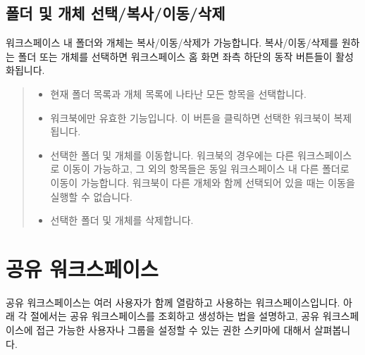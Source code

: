 \documentclass[letterpaper,10pt,english]{sphinxmanual}
\begin{document}
\subsection{폴더 및 개체 선택/복사/이동/삭제}
\label{\detokenize{discovery/part03/workspace_management:actions}}\label{\detokenize{discovery/part03/workspace_management:id5}}
워크스페이스 내 폴더와 개체는 복사/이동/삭제가 가능합니다. 복사/이동/삭제를 원하는 폴더 또는 개체를 선택하면 워크스페이스 홈 화면 좌측 하단의 동작 버튼들이 활성화됩니다.
\begin{quote}

\begin{figure}[H]
\centering

\noindent{}
\end{figure}
\begin{itemize}
\item {} 
 현재 폴더 목록과 개체 목록에 나타난 모든 항목을 선택합니다.

\item {} 
 워크북에만 유효한 기능입니다. 이 버튼을 클릭하면 선택한 워크북이 복제됩니다.

\item {} 
 선택한 폴더 및 개체를 이동합니다. 워크북의 경우에는 다른 워크스페이스로 이동이 가능하고, 그 외의 항목들은 동일 워크스페이스 내 다른 폴더로 이동이 가능합니다. 워크북이 다른 개체와 함께 선택되어 있을 때는 이동을 실행할 수 없습니다.

\item {} 
 선택한 폴더 및 개체를 삭제합니다.

\end{itemize}
\end{quote}


\section{공유 워크스페이스}
\label{\detokenize{discovery/part03/shared_workspace:id1}}\label{\detokenize{discovery/part03/shared_workspace::doc}}
공유 워크스페이스는 여러 사용자가 함께 열람하고 사용하는 워크스페이스입니다. 아래 각 절에서는 공유 워크스페이스를 조회하고 생성하는 법을 설명하고, 공유 워크스페이스에 접근 가능한 사용자나 그룹을 설정할 수 있는 권한 스키마에 대해서 살펴봅니다.
\end{document}
